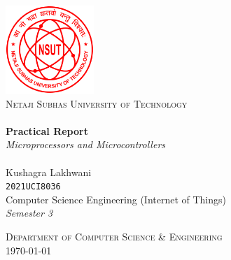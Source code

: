 \begin{titlepage}
    \begin{center}

        \includegraphics[width=0.25\textwidth]{res/NSUT.png}~\\[0.5cm]
        \textsc{\Large Netaji Subhas University of Technology}\\[2cm]

        \HRule \\[0.4cm]
        {
        \LARGE
        \textbf{Practical Report}\\[0.4cm]
        \emph{Microprocessors and Microcontrollers}\\[0.4cm]
        }
        \HRule \\[1.5cm]



        {
        \large
        Kushagra Lakhwani \\[0.1cm]
        \texttt{2021UCI8036}\\[2.7cm]
        Computer Science Engineering (Internet of Things)\\[0.1cm]
        \textit{Semester 3} \\[0.1cm]
        }

        \vfill

        \textsc{\large Department of Computer Science \& Engineering}\\[0.4cm]


        {\large \today}

    \end{center}
\end{titlepage}